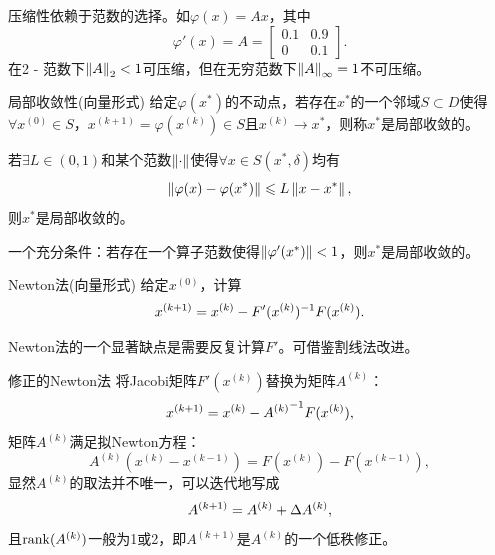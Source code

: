 \begin{remark}
    压缩性依赖于范数的选择。如$\varphi(x)=Ax$，其中
    \[
        \varphi'(x)=A=\begin{bmatrix}
            0.1&0.9\\0&0.1
        \end{bmatrix}.
    \]
    在2 - 范数下$\left\lVert A\right\rVert_2<1$可压缩，但在无穷范数下$\left\lVert A\right\rVert_\infty=1$不可压缩。
\end{remark}

\begin{definition}
    {局部收敛性(向量形式)}{}
    给定$\varphi(x^*)$的不动点，若存在$x^*$的一个邻域$S\subset D$使得$\forall x^{(0)}\in S$，$x^{(k+1)}=\varphi(x^{(k)})\in S$且$x^{(k)}\to x^*$，则称$x^*$是局部收敛的。
\end{definition}

\begin{theorem}
    {}{}
    若$\exists L\in(0,1)$和某个范数$\left\lVert\cdot\right\rVert$使得$\forall x\in S(x^*,\delta)$均有
    \[
        \left\lVert\varphi(x)-\varphi(x^*)\right\rVert\leqslant L\left\lVert x-x^*\right\rVert,
    \]
    则$x^*$是局部收敛的。
\end{theorem}

\begin{corollary}
    一个充分条件：若存在一个算子范数使得$\left\lVert\varphi'(x^*)\right\rVert<1$，则$x^*$是局部收敛的。
\end{corollary}

\begin{theorem}
    {Newton法(向量形式)}{}
    给定$x^{(0)}$，计算 
    \[
        x^{(k+1)}=x^{(k)}-F'(x^{(k)})^{-1} F(x^{(k)}).
    \]
\end{theorem}

\begin{remark}
    Newton法的一个显著缺点是需要反复计算$F'$。可借鉴割线法改进。
\end{remark}

\begin{theorem}
    {修正的Newton法}{}
    将Jacobi矩阵$F'(x^{(k)})$替换为矩阵$A^{(k)}$：
    \[
        x^{(k+1)}=x^{(k)}-{A^{(k)}}^{-1} F(x^{(k)}),
    \]
    矩阵$A^{(k)}$满足拟Newton方程：
    \begin{equation}
        A^{(k)}(x^{(k)}-x^{(k-1)})=F(x^{(k)})-F(x^{(k-1)}),
    \end{equation}
    显然$A^{(k)}$的取法并不唯一，可以迭代地写成
    \[
        A^{(k+1)}=A^{(k)}+\Delta A^{(k)},
    \]
    且$\operatorname{rank}(A^{(k)})$一般为1或2，即$A^{(k+1)}$是$A^{(k)}$的一个低秩修正。
\end{theorem}

